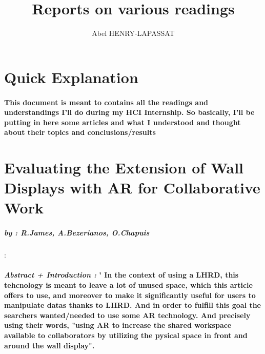 \documentclass{article}
\title{Reports on various readings}
\author{Abel HENRY-LAPASSAT}
\begin{document}
\maketitle
\section{Quick Explanation}
    \paragraph{ \textnormal{This document is meant to contains all the readings and understandings I'll do during my HCI Internship.
        So basically, I'll be putting in here some articles and what I understood and thought about their topics and conclusions/results} }

\section{Evaluating the Extension of Wall Displays with AR for Collaborative Work}
    \subparagraph{by : R.James, A.Bezerianos, O.Chapuis}
    \cite{EEWDARCW:2023-03} : \href{https://doi.org/\citefield{EEWDARCW:2023-03}{doi}}{}
    \paragraph{ \textit{Abstract + Introduction :}
                \newline
                \textnormal{'   In the context of using a LHRD, this tehcnology is meant to leave a lot of unused space, which this article offers to
                use, and moreover to make it significantly useful for users to manipulate datas thanks to LHRD. And in order to fulfill this goal
                the searchers wanted/needed to use some AR technology. And precisely using their words, "using AR to increase the shared
                workspace available to collaborators by utilizing the pysical space in front and around the wall display".}}
\end{document}

